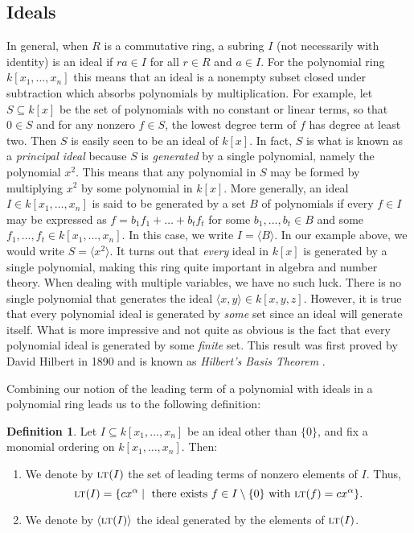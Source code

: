 \documentclass[MS, xcolor=dvipsnames]{wfuthesis}
\def\sbs{\subseteq}
\newcommand{\LT}{\ensuremath{\text{\sc lt}}}
\theoremstyle{definition}
\newtheorem{definition}[theorem]{Definition}
\begin{document}
\subsection{Ideals}
In general, when $R$ is a commutative ring, a subring $I$ (not necessarily with identity) is an ideal if $ra \in I$ for all $r \in R$ and $a \in I$. For the polynomial ring $k[x_1,\dots,x_n]$ this means that an ideal is a nonempty subset closed under subtraction which absorbs polynomials by multiplication. For example, let $S \sbs k[x]$ be the set of polynomials with no constant or linear terms, so that $0 \in S$ and for any nonzero $f \in S$, the lowest degree term of $f$ has degree at least two. Then $S$ is easily seen to be an ideal of $k[x]$. In fact, $S$ is what is known as a \textit{principal ideal} because $S$ is \textit{generated} by a single polynomial, namely the polynomial $x^2$. This means that any polynomial in $S$ may be formed by multiplying $x^2$ by some polynomial in $k[x]$. More generally, an ideal $I \in k[x_1,\dots,x_n]$ is said to be generated by a set $B$ of polynomials if every $f \in I$ may be expressed as $f = b_1f_1 + \dots + b_tf_t$ for some $b_1,\dots,b_t \in B$ and some $f_1,\dots,f_t \in k[x_1,\dots,x_n]$. In this case, we write $I = \langle B \rangle$. In our example above, we would write $S = \langle x^2 \rangle$. It turns out that \textit{every} ideal in $k[x]$ is generated by a single polynomial, making this ring quite important in algebra and number theory. When dealing with multiple variables, we have no such luck. There is no single polynomial that generates the ideal $\langle x,y \rangle \in k[x,y,z]$. However, it is true that every polynomial ideal is generated by \textit{some} set since an ideal will generate itself. What is more impressive and not quite as obvious is the fact that every polynomial ideal is generated by some \textit{finite} set. This result was first proved by David Hilbert in 1890 and is known as \textit{Hilbert's Basis Theorem} \cite{Hilbert1890}. \par
Combining our notion of the leading term of a polynomial with ideals in a polynomial ring leads us to the following definition:
\begin{definition}
  Let $I \sbs k[x_1,\dots,x_n]$ be an ideal other than $\{0\}$, and fix a monomial ordering on $k[x_1,\dots,x_n]$. Then:
  \begin{enumerate}[label=(\roman*)]
    \item We denote by $\LT(I)$ the set of leading terms of nonzero elements of $I$. Thus,
    \[ \LT(I) = \{ cx^\alpha \mid \text{ there exists } f \in I \setminus \{0\} \text{ with } \LT(f) = cx^\alpha \}. \]
    \item We denote by $\langle \LT(I) \rangle$ the ideal generated by the elements of $\LT(I)$.
  \end{enumerate}
\end{definition}
\end{document}
